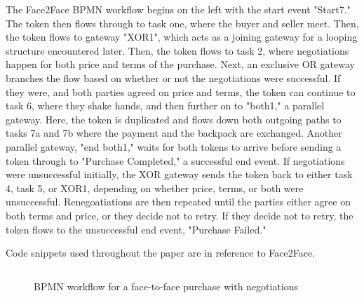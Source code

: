 The Face2Face BPMN workflow begins on the left with the start event "Start7." The token then flows through to task one, where the buyer and seller meet. Then, the token flows to gateway "XOR1", which acts as a joining gateway for a looping structure encountered later. Then, the token flows to task 2, where negotiations happen for both price and terms of the purchase. Next, an exclusive OR gateway branches the flow based on whether or not the negotiations were successful. If they were, and both parties agreed on price and terms, the token can continue to task 6, where they shake hands, and then further on to "both1," a parallel gateway. Here, the token is duplicated and flows down both outgoing paths to tasks 7a and 7b where the payment and the backpack are exchanged. Another parallel gateway, "end both1," waits for both tokens to arrive before sending a token through to "Purchase Completed," a successful end event. If negotiations were unsuccessful initially, the XOR gateway sends the token back to either task 4, task 5, or XOR1, depending on whether price, terms, or both were unsuccessful. Renegoatiations are then repeated until the parties either agree on both terms and price, or they decide not to retry. If they decide not to retry, the token flows to the unsuccessful end event, "Purchase Failed."


Code snippets used throughout the paper are in reference to Face2Face.

\begin{figure}[t]
  \begin{center}
    \begin{tabular}{c}
        
    \end{tabular}
  \end{center}
\caption{BPMN workflow for a face-to-face purchase with negotiations}
\label{fig:face2face_bpmn}
\end{figure}

